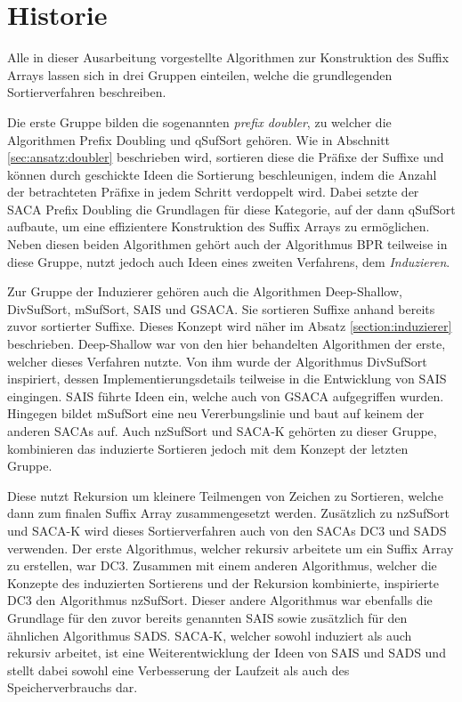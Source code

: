 \section{Historie}
Alle  in dieser Ausarbeitung vorgestellte Algorithmen zur Konstruktion des Suffix Arrays lassen sich in drei Gruppen einteilen, welche die grundlegenden Sortierverfahren beschreiben. \par
Die erste Gruppe bilden die sogenannten \textit{prefix doubler}, zu welcher die Algorithmen Prefix Doubling und qSufSort gehören.
Wie in Abschnitt \ref{sec:ansatz:doubler} beschrieben wird, sortieren diese die Präfixe der Suffixe und können durch geschickte Ideen die Sortierung beschleunigen, indem die Anzahl der betrachteten Präfixe in jedem Schritt verdoppelt wird. 
Dabei setzte der SACA Prefix Doubling die Grundlagen für diese Kategorie, auf der dann qSufSort aufbaute, um eine effizientere Konstruktion des Suffix Arrays zu ermöglichen. 
Neben diesen beiden Algorithmen gehört auch der Algorithmus BPR teilweise in diese Gruppe, nutzt jedoch auch Ideen eines zweiten Verfahrens, dem \textit{Induzieren}. \par

Zur Gruppe der Induzierer gehören auch die Algorithmen Deep-Shallow, DivSufSort, mSufSort, SAIS und GSACA.
Sie sortieren Suffixe anhand bereits zuvor sortierter Suffixe.
Dieses Konzept wird näher im Absatz \ref{section:induzierer} beschrieben.
Deep-Shallow war von den hier behandelten Algorithmen der erste, welcher dieses Verfahren nutzte.
Von ihm wurde der Algorithmus DivSufSort inspiriert, dessen Implementierungsdetails teilweise in die Entwicklung von SAIS eingingen.
SAIS führte Ideen ein, welche auch von GSACA aufgegriffen wurden.
Hingegen bildet mSufSort eine neu Vererbungslinie und baut auf keinem der anderen SACAs auf.
Auch nzSufSort und SACA-K gehörten zu dieser Gruppe, kombinieren das induzierte Sortieren jedoch mit dem Konzept der letzten Gruppe. \par

Diese nutzt Rekursion um kleinere Teilmengen von Zeichen zu Sortieren, welche dann zum finalen Suffix Array zusammengesetzt werden.
Zusätzlich zu nzSufSort und SACA-K wird dieses Sortierverfahren auch von den SACAs DC3 und SADS verwenden. 
Der erste Algorithmus, welcher rekursiv arbeitete um ein Suffix Array zu erstellen, war DC3. 
Zusammen mit einem anderen Algorithmus, welcher die Konzepte des induzierten Sortierens und der Rekursion kombinierte, inspirierte DC3 den Algorithmus nzSufSort. 
Dieser andere Algorithmus war ebenfalls die Grundlage für den zuvor bereits genannten SAIS sowie zusätzlich für den ähnlichen Algorithmus SADS.
SACA-K, welcher sowohl induziert als auch rekursiv arbeitet, ist eine Weiterentwicklung der Ideen von SAIS und SADS und stellt dabei sowohl eine Verbesserung der Laufzeit als auch des Speicherverbrauchs dar. \par

